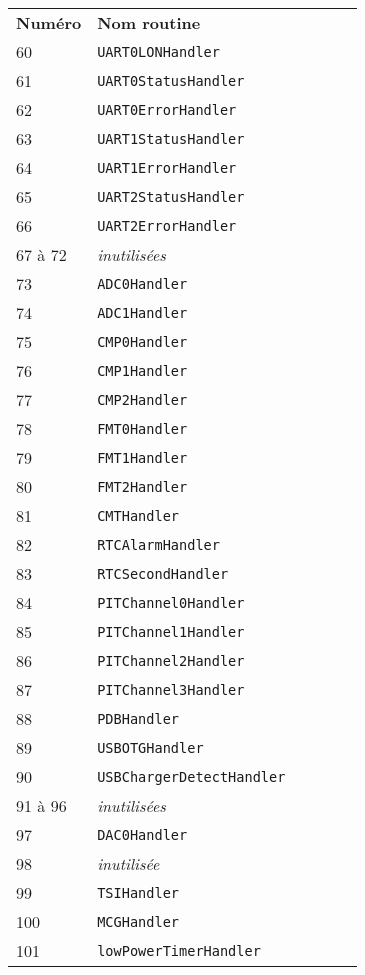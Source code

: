 \begin{table}[!t]
  \centering
  \begin{tabular}{llllll}
    \textbf{Numéro}& \textbf{Nom routine} \\
    60  & \texttt{UART0LONHandler}\\
    61  & \texttt{UART0StatusHandler}\\
    62  & \texttt{UART0ErrorHandler}\\
    63  & \texttt{UART1StatusHandler}\\
    64  & \texttt{UART1ErrorHandler}\\
    65  & \texttt{UART2StatusHandler}\\
    66  & \texttt{UART2ErrorHandler}\\
    67 à 72  & \emph{inutilisées} \\
    73  & \texttt{ADC0Handler}\\
    74  & \texttt{ADC1Handler}\\
    75  & \texttt{CMP0Handler}\\
    76  & \texttt{CMP1Handler}\\
    77  & \texttt{CMP2Handler}\\
    78  & \texttt{FMT0Handler}\\
    79  & \texttt{FMT1Handler}\\
    80  & \texttt{FMT2Handler}\\
    81  & \texttt{CMTHandler}\\
    82  & \texttt{RTCAlarmHandler}\\
    83  & \texttt{RTCSecondHandler}\\
    84  & \texttt{PITChannel0Handler}\\
    85  & \texttt{PITChannel1Handler}\\
    86  & \texttt{PITChannel2Handler}\\
    87  & \texttt{PITChannel3Handler}\\
    88  & \texttt{PDBHandler}\\
    89  & \texttt{USBOTGHandler}\\
    90  & \texttt{USBChargerDetectHandler}\\
    91 à 96  & \emph{inutilisées} \\
    97  & \texttt{DAC0Handler}\\
    98  & \emph{inutilisée} \\
    99  & \texttt{TSIHandler}\\
    100  & \texttt{MCGHandler}\\
    101  & \texttt{lowPowerTimerHandler}\\

\end{tabular}
\end{table}
